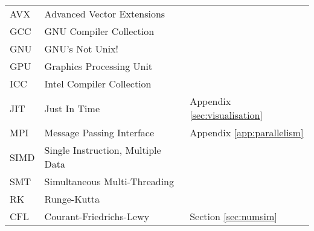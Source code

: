 \begin{abbreviations}
\begin{table}[h]
\begin{tabular}{lll}
    \hline

    AVX  & Advanced Vector Extensions & \\
    GCC  & GNU Compiler Collection & \\
    GNU  & GNU's Not Unix! & \\
    GPU  & Graphics Processing Unit & \\
    ICC  & Intel Compiler Collection & \\
    JIT  & Just In Time & Appendix \ref{sec:visualisation} \\
    MPI  & Message Passing Interface & Appendix \ref{app:parallelism} \\
    SIMD & Single Instruction, Multiple Data & \\
    SMT  & Simultaneous Multi-Threading & \\

    \hline

    RK & Runge-Kutta & \\
    CFL & Courant-Friedrichs-Lewy & Section \ref{sec:numsim} \\

  \end{tabular} 
  \label{tbl:Abbreviations}
\end{table}



\end{abbreviations}
